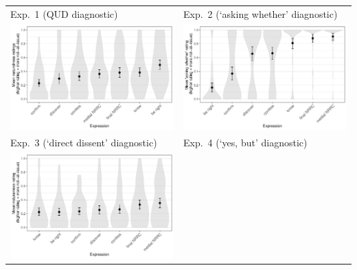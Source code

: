 \documentclass[compress, xcolor = dvipsnames, aspectratio=169]{beamer}
\begin{document}
	\begin{frame}[t]
		\scriptsize\centering
		\vspace{-1.3\baselineskip}
		\begin{tabular}{p{.4\linewidth} p{.4\linewidth}}
			{\centering Exp.~1 (QUD diagnostic)} &
			{\centering Exp.~2 (`asking whether' diagnostic)} \\
      		\includegraphics[width=\linewidth]{../../results/exp1/graphs/mean-ratings.pdf}
      		&
      		\includegraphics[width=\linewidth]{../../results/exp2/graphs/mean-ratings.pdf}
      		\\
      		{\centering Exp.~3 (`direct dissent' diagnostic)} &
			{\centering Exp.~4 (`yes, but' diagnostic)} \\
      		\includegraphics[width=\linewidth]{../../results/exp3/graphs/mean-ratings.pdf}

\end{tabular}
\end{frame}
\end{document}
